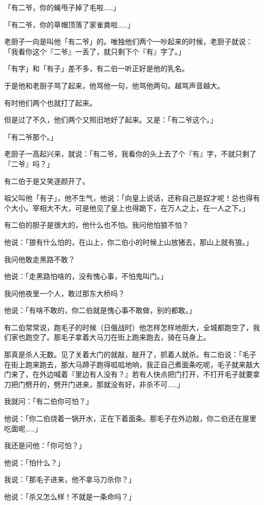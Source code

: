 \documentclass[UTF8]{ctexart}
\begin{document}
「有二爷，你的蝇甩子掉了毛啦……」

「有二爷，你的草帽顶落了家雀粪啦……」

老厨子一向是叫他「有二爷」的。唯独他们两个一吵起来的时候，老厨子就说：「我看你这个『二爷』一丢了，就只剩下个『有』字了。」

「有字」和「有子」差不多，有二伯一听正好是他的乳名。

于是他和老厨子骂了起来，他骂他一句，他骂他两句。越骂声音越大。

有时他们两个也就打了起来。

但是过了不久，他们两个又照旧地好了起来。又是：「有二爷这个。」

「有二爷那个。」

老厨子一高起兴来，就说：「有二爷，我看你的头上去了个『有』字，不就只剩了『二爷』吗？」

有二伯于是又笑逐颜开了。

祖父叫他「有子」，他不生气，他说：「向皇上说话，还称自己是奴才呢！总也得有个大小。宰相大不大，可是他见了皇上也得跪下，在万人之上，在一人之下。」

有二伯的胆子是很大的，他什么也不怕。我问他怕狼不怕？

他说：「狼有什么怕的，在山上，你二伯小的时候上山放猪去，那山上就有狼。」

我问他敢走黑路不敢？

他说：「走黑路怕啥的，没有愧心事，不怕鬼叫门。」

我问他夜里一个人，敢过那东大桥吗？

他说：「有啥不敢的，你二伯就是愧心事不敢做，别的都敢。」

有二伯常常说，跑毛子的时候（日俄战时）他怎样怎样地胆大，全城都跑空了，我们家也跑空了。那毛子拿着大马刀在街上跑来跑去，骑在马身上。

那真是杀人无数。见了关着大门的就敲，敲开了，抓着人就杀。有二伯说：「毛子在街上跑来跑去，那大马蹄子跑得呱呱地响，我正自己煮面条吃呢，毛子就来敲大门来了，在外边喊着『里边有人没有？』若有人快点把门打开，不打开毛子就要拿刀把门劈开的，劈开门进来，那就没有好，非杀不可……」

我就问：「有二伯你可怕？」

他说：「你二伯烧着一锅开水，正在下着面条。那毛子在外边敲，你二伯还在屋里吃面呢……」

我还是问他：「你可怕？」

他说：「怕什么？」

我说：「那毛子进来，他不拿马刀杀你？」

他说：「杀又怎么样！不就是一条命吗？」
\end{document}
